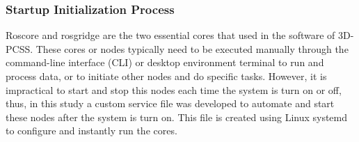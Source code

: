 \subsubsection{Startup Initialization Process}
Roscore and rosgridge are the two essential cores that used in the software of 3D-PCSS. These cores or nodes typically need to be executed manually through the command-line interface (CLI) or desktop environment terminal to run and process data, or to initiate other nodes and do specific tasks. However, it is impractical to start and stop this nodes each time the system is turn on or off, thus, in this study a custom service file was developed to automate and start these nodes after the system is turn on. This file is created using Linux systemd to configure and instantly run the cores.





